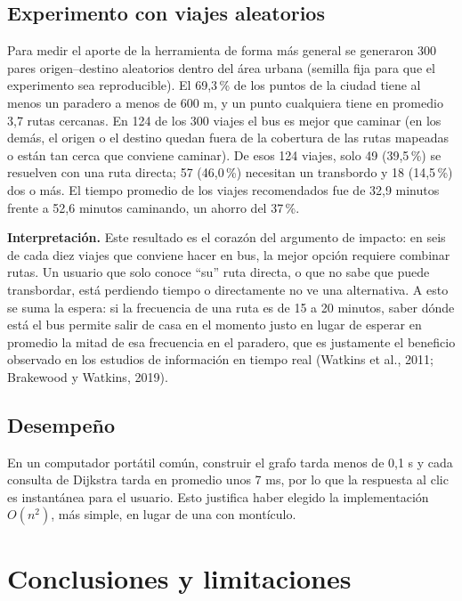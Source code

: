 \documentclass[12pt,letterpaper]{article}
\begin{document}
\subsection{Experimento con viajes aleatorios}
Para medir el aporte de la herramienta de forma más general se generaron 300 pares origen--destino aleatorios dentro del área urbana (semilla fija para que el experimento sea reproducible). El 69,3\,\% de los puntos de la ciudad tiene al menos un paradero a menos de 600 m, y un punto cualquiera tiene en promedio 3,7 rutas cercanas. En 124 de los 300 viajes el bus es mejor que caminar (en los demás, el origen o el destino quedan fuera de la cobertura de las rutas mapeadas o están tan cerca que conviene caminar). De esos 124 viajes, solo 49 (39,5\,\%) se resuelven con una ruta directa; 57 (46,0\,\%) necesitan un transbordo y 18 (14,5\,\%) dos o más. El tiempo promedio de los viajes recomendados fue de 32,9 minutos frente a 52,6 minutos caminando, un ahorro del 37\,\%.

\textbf{Interpretación.} Este resultado es el corazón del argumento de impacto: en seis de cada diez viajes que conviene hacer en bus, la mejor opción requiere combinar rutas. Un usuario que solo conoce ``su'' ruta directa, o que no sabe que puede transbordar, está perdiendo tiempo o directamente no ve una alternativa. A esto se suma la espera: si la frecuencia de una ruta es de 15 a 20 minutos, saber dónde está el bus permite salir de casa en el momento justo en lugar de esperar en promedio la mitad de esa frecuencia en el paradero, que es justamente el beneficio observado en los estudios de información en tiempo real (Watkins et al., 2011; Brakewood y Watkins, 2019).

\subsection{Desempeño}
En un computador portátil común, construir el grafo tarda menos de 0,1 s y cada consulta de Dijkstra tarda en promedio unos 7 ms, por lo que la respuesta al clic es instantánea para el usuario. Esto justifica haber elegido la implementación $O(n^2)$, más simple, en lugar de una con montículo.

\section{Conclusiones y limitaciones}
\end{document}
